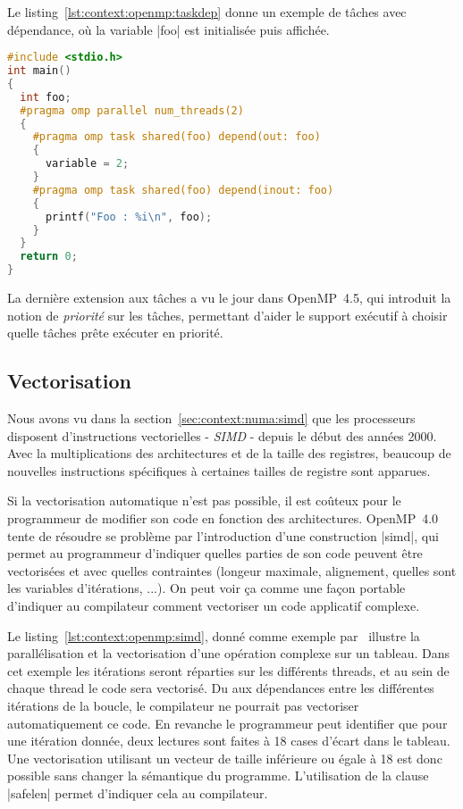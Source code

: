 Le listing~\ref{lst:context:openmp:taskdep} donne un exemple de tâches avec dépendance, où la variable |foo| est initialisée puis affichée.

\begin{lstlisting}[language=c++,caption=Exemple de tâches avec dépendances,label=lst:context:openmp:taskdep]
#include <stdio.h>
int main()
{
  int foo;
  #pragma omp parallel num_threads(2)
  {
    #pragma omp task shared(foo) depend(out: foo)
    {
      variable = 2;
    }
    #pragma omp task shared(foo) depend(inout: foo)
    {
      printf("Foo : %i\n", foo);
    }
  }
  return 0;
}
\end{lstlisting}

La dernière extension aux tâches a vu le jour dans OpenMP~4.5, qui introduit la notion de \emph{priorité} sur les tâches, permettant d'aider le support exécutif à choisir quelle tâches prête exécuter en priorité.

\subsection{Vectorisation}

Nous avons vu dans la section~\ref{sec:context:numa:simd} que les processeurs disposent d'instructions vectorielles - \emph{SIMD} - depuis le début des années 2000.
Avec la multiplications des architectures et de la taille des registres, beaucoup de nouvelles instructions spécifiques à certaines tailles de registre sont apparues.

Si la vectorisation automatique n'est pas possible, il est coûteux pour le programmeur de modifier son code en fonction des architectures.
OpenMP~4.0 tente de résoudre se problème par l'introduction d'une construction |simd|, qui permet au programmeur d'indiquer quelles parties de son code peuvent être vectorisées et avec quelles contraintes (longeur maximale, alignement, quelles sont les variables d'itérations, ...).
On peut voir ça comme une façon portable d'indiquer au compilateur comment vectoriser un code applicatif complexe.

Le listing~\ref{lst:context:openmp:simd}, donné comme exemple par~\cite{HPCToday} illustre la parallélisation et la vectorisation d'une opération complexe sur un tableau.
Dans cet exemple les itérations seront réparties sur les différents threads, et au sein de chaque thread le code sera vectorisé.
Du aux dépendances entre les différentes itérations de la boucle, le compilateur ne pourrait pas vectoriser automatiquement ce code.
En revanche le programmeur peut identifier que pour une itération donnée, deux lectures sont faites à 18 cases d'écart dans le tableau. Une vectorisation utilisant un vecteur de taille inférieure ou égale à 18 est donc possible sans changer la sémantique du programme.
L'utilisation de la clause |safelen| permet d'indiquer cela au compilateur.


